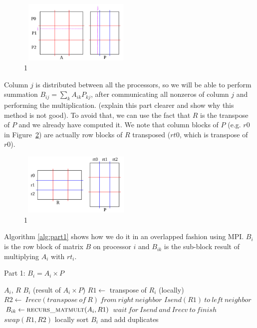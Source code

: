 \begin{figure}[tbh]
 \centering
 \includegraphics[width=5.5cm,height=3cm]{./figures/part1b.pdf}
 \caption{1}
 \label{fig:part1b}
\end{figure}

Column $j$ is distributed between all the processors, so we will be able to perform  summation $B_{ij} = \sum_{k} A_{ik} P_{kj}$, after communicating all nonzeros of column $j$ and performing the multiplication. (explain this part clearer and show why this method is not good). To avoid that, we can use the fact that $R$ is the transpose of $P$ and we already have computed it. We note that column blocks of $P$ (e.g. $r0$ in Figure~\ref{fig:part1c}) are actually row blocks of $R$ transposed ($rt0$, which is transpose of $r0$).

\begin{figure}[tbh]
 \centering
 \includegraphics[width=5.5cm,height=3cm]{./figures/part1c.pdf}
 \caption{1}
 \label{fig:part1c}
\end{figure}

Algorithm \ref{alg:part1} shows how we do it in an overlapped fashion using MPI. $B_{i}$ is the row block of matrix $B$ on processor $i$ and $B_{ik}$ is the sub-block result of multiplying $A_i$ with $rt_i$.

\begin{algorithm}[H] 
  \caption{Part 1: $B_i = A_i \times P$} \label{alg:part1} 
  \begin{algorithmic}[1]
    \Require $A_i$, $R$
    \Ensure  $B_i$ (result of $A_i \times P$)
    \State $R1 \leftarrow$ transpose of $R_i$ (locally)
      \State $R2 \leftarrow\ Irecv(transpose\ of\ R)\ from\ right\ neighbor$
      \State $Isend(R1)\ to\ left\ neighbor$
      \State $B_{ik} \leftarrow \textsc{recurs\_matmult}(A_i, R1)$ 
      \State $wait\ for\ Isend\ and\ Irecv\ to\ finish$
      \State $swap(R1,R2)$
    \EndFor
    \State locally sort $B_i$ and add duplicates
  \end{algorithmic}
\end{algorithm}


